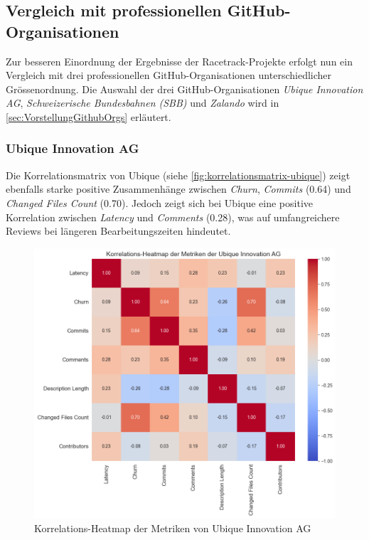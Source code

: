 \newpage
\subsection{Vergleich mit professionellen GitHub-Organisationen}
Zur besseren Einordnung der Ergebnisse der Racetrack-Projekte erfolgt nun ein Vergleich mit drei professionellen GitHub-Organisationen unterschiedlicher Grössenordnung. Die Auswahl der drei GitHub-Organisationen \textit{Ubique Innovation AG}, \textit{Schweizerische Bundesbahnen (SBB)} und \textit{Zalando} wird in \autoref{sec:VorstellungGithubOrgs} erläutert. 


\subsubsection{Ubique Innovation AG}
Die Korrelationsmatrix von Ubique (siehe 
\autoref{fig:korrelationsmatrix-ubique}) zeigt ebenfalls starke positive Zusammenhänge zwischen \textit{Churn}, \textit{Commits} (0.64) und \textit{Changed Files Count} (0.70). Jedoch zeigt sich bei Ubique eine positive Korrelation zwischen \textit{Latency} und \textit{Comments} (0.28), was auf umfangreichere Reviews bei längeren Bearbeitungszeiten hindeutet.

\begin{figure}[htbp]
\includegraphics[width=\textwidth]{Figures/ubique-korrelationsmatrix.png}
\caption{Korrelations-Heatmap der Metriken von Ubique Innovation AG}
\label{fig:korrelationsmatrix-ubique}
\end{figure}

